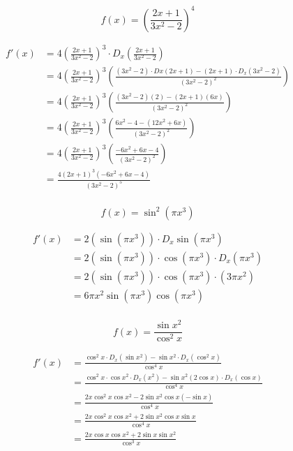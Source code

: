 \documentclass[fleqn,addpoints]{exam}
\begin{document}
\begin{questions}
\ifprintanswers
\else
\pagebreak
\fi

\question[10]
\[
  f(x) = \left( \frac{2x+ 1}{3x^2 - 2} \right)^4
\]
\begin{solution}[8 cm]
\begin{align*}
  f'(x) &= 4 \left( \frac{2x+ 1}{3x^2 - 2} \right)^3 \cdot D_x \left( \frac{2x+ 1}{3x^2 - 2} \right) \\
        &= 4 \left( \frac{2x+ 1}{3x^2 - 2} \right)^3 
             \left( \frac{(3x^2 - 2) \cdot Dx(2x+ 1) - (2x + 1) \cdot D_x(3x^2 - 2)}{(3x^2 - 2)^2} \right) \\
        &= 4 \left( \frac{2x+ 1}{3x^2 - 2} \right)^3 \left( \frac{(3x^2 - 2)(2) - (2x + 1)(6x)}{(3x^2 - 2)^2} \right) \\
        &= 4 \left( \frac{2x+ 1}{3x^2 - 2} \right)^3 \left( \frac{6x^2 - 4 - (12x^2 + 6x)}{(3x^2 - 2)^2} \right) \\
        &= 4 \left( \frac{2x+ 1}{3x^2 - 2} \right)^3 \left( \frac{-6x^2 + 6x - 4}{(3x^2 - 2)^2} \right) \\
        &= \frac{4(2x+ 1)^3(-6x^2 + 6x - 4)}{(3x^2 - 2)^5}  \\
\end{align*}
\end{solution}

\ifprintanswers
\pagebreak
\fi

\question[10]
\[
  f(x) = \sin^2 \left( \pi x^3 \right)
\]
\begin{solution}[6 cm]
\begin{align*}
  f'(x) &= 2(\sin \left( \pi x^3 \right)) \cdot D_x \sin \left( \pi x^3 \right) \\
        &= 2 \left( \sin \left( \pi x^3 \right) \right) \cdot \cos \left( \pi x^3 \right) \cdot D_x \left( \pi x^3 \right) \\
        &= 2(\sin \left( \pi x^3 \right)) \cdot \cos \left( \pi x^3 \right) \cdot \left( 3 \pi x^2 \right) \\
        &= 6 \pi x^2 \sin \left( \pi x^3 \right) \cos \left( \pi x^3 \right) \\
\end{align*}
\end{solution}

\ifprintanswers
\else
\pagebreak
\fi

\question[10]
\label{derivative:last}
\[
  f(x) = \frac{\sin x^2}{\cos^2 x}
\]
\begin{solution}[8 cm]
\begin{align*}
  f'(x) &= \frac{\cos^2 x \cdot D_x \left( \sin x^2 \right) - \sin x^2 \cdot D_x \left( \cos^2 x \right)}{ \cos^4 x} \\
        &= \frac{\cos^2 x \cdot \cos x^2 \cdot D_x(x^2) - \sin x^2 ( 2 \cos x) \cdot D_x(\cos x)}{ \cos^4 x} \\
        &= \frac{2 x \cos^2 x \cos x^2 - 2 \sin x^2 \cos x(-\sin x)}{ \cos^4 x} \\
        &= \frac{2 x \cos^2 x \cos x^2 + 2 \sin x^2 \cos x \sin x}{ \cos^4 x} \\
        &= \frac{2 x \cos x \cos x^2 + 2 \sin x \sin x^2 }{ \cos^3 x} \\
\end{align*}


\end{solution}
\end{questions}
\end{document}
